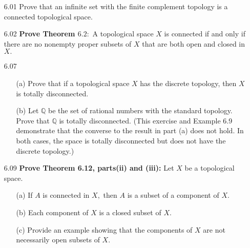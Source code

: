 \documentclass[12pt]{article}
\begin{document}
	\pagestyle{fancy}  
	\lfoot{} \cfoot{} \rfoot{}
	
	\begin{enumerate}
		\item[6.01] Prove that an infinite set with the finite complement topology is a connected
		topological space.\\
		
		\item[6.02] \textbf{Prove Theorem $6.2 :$} A topological space $X$ is connected if and only if there are no nonempty proper subsets of $X$ that are both open and closed in $X .$
		
		\item[6.07] \begin{enumerate}
			\item[(a)]  Prove that if a topological space $X$ has the discrete topology, then $X$ is totally disconnected.
			\item[(b)] Let $\mathbb { Q }$ be the set of rational numbers with the standard topology. Prove	that $\mathbb { Q }$ is totally disconnected. (This exercise and Example 6.9 demonstrate that the converse to the result in part (a) does not hold. In both cases, the space is totally disconnected but does not have the discrete topology.)
		\end{enumerate}
		
		\item[6.09] \textbf{Prove Theorem 6.12, parts(ii) and (iii):} Let $ X $ be a topological space.
		\begin{enumerate}
			\item[(a)]If $A$ is connected in $X ,$ then $A$ is a subset of a component of $X .$
			\item[(b)]Each component of $X$ is a closed subset of $X .$
			\item[(c)] Provide an example showing that the components of $X$ are not necessarily
			open subsets of $X .$
		\end{enumerate}
		

\end{enumerate}
\end{document}
